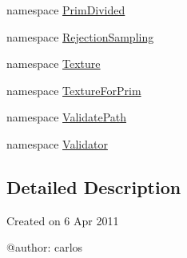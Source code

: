 \begin{DoxyCompactItemize}
\item 
namespace \hyperlink{namespacedestruction_1_1_prim_divided}{Prim\-Divided}
\item 
namespace \hyperlink{namespacedestruction_1_1_rejection_sampling}{Rejection\-Sampling}
\item 
namespace \hyperlink{namespacedestruction_1_1_texture}{Texture}
\item 
namespace \hyperlink{namespacedestruction_1_1_texture_for_prim}{Texture\-For\-Prim}
\item 
namespace \hyperlink{namespacedestruction_1_1_validate_path}{Validate\-Path}
\item 
namespace \hyperlink{namespacedestruction_1_1_validator}{Validator}
\end{DoxyCompactItemize}


\subsection{Detailed Description}
\begin{DoxyVerb}Created on 6 Apr 2011

@author: carlos
\end{DoxyVerb}
 